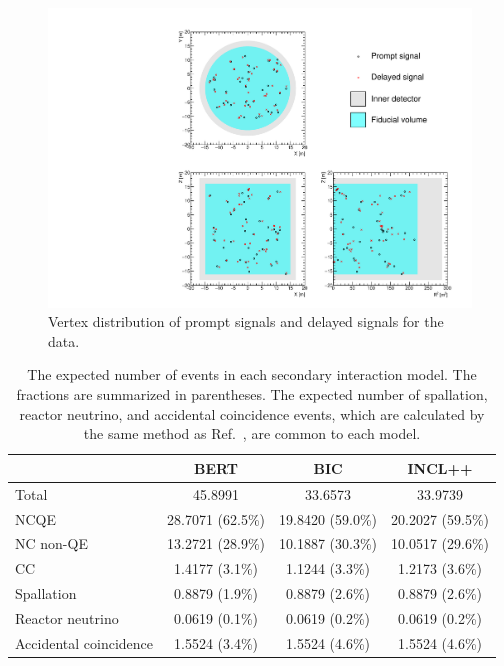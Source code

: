 \begin{figure}[h]
	\centering
	\includegraphics[width=14cm]{PDF/Figure07/Figure07_prompt_delay}
	\caption[Vertex distribution of prompt signals and delayed signals for the data]{
	Vertex distribution of prompt signals and delayed signals for the data.
	}\label{Figure07}
\end{figure}

\begin{table}[h]
	\centering
	\caption[The expected number of events in each secondary interaction model]{
	The expected number of events in each secondary interaction model.
	The fractions are summarized in parentheses.
	The expected number of spallation, reactor neutrino, and accidental coincidence events, which are calculated by the same method as Ref.~\cite{2023Harada}, are common to each model.
	}\label{tab:num}
	\vs
	\begin{tabular}{lccc} \hline \hline
		                       & BERT             & BIC              & INCL++           \\ \hline
		Total                  & 45.8991          & 33.6573          & 33.9739          \\ \hline
		NCQE                   & 28.7071 (62.5\%) & 19.8420 (59.0\%) & 20.2027 (59.5\%) \\
		NC non-QE              & 13.2721 (28.9\%) & 10.1887 (30.3\%) & 10.0517 (29.6\%) \\
		CC                     & 1.4177 (3.1\%)   & 1.1244 (3.3\%)   & 1.2173 (3.6\%)   \\ \hline
		Spallation             & 0.8879 (1.9\%)   & 0.8879 (2.6\%)   & 0.8879 (2.6\%)   \\
		Reactor neutrino       & 0.0619 (0.1\%)   & 0.0619 (0.2\%)   & 0.0619 (0.2\%)   \\
		Accidental coincidence & 1.5524 (3.4\%)   & 1.5524 (4.6\%)   & 1.5524 (4.6\%)   \\ \hline \hline
	\end{tabular}
\end{table}

